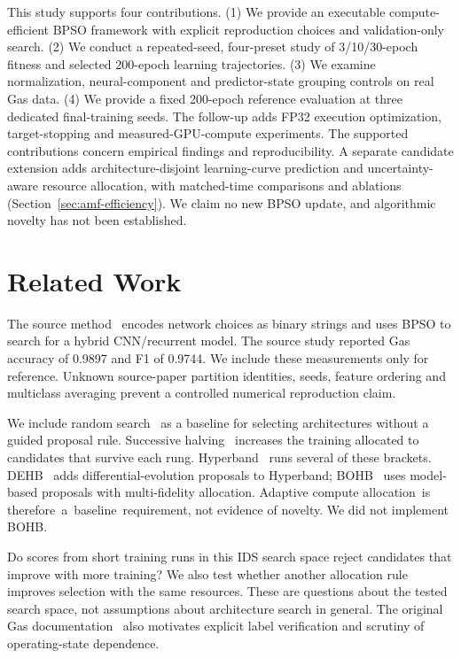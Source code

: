 This study supports four contributions. (1) We provide an executable compute-efficient BPSO framework with explicit reproduction choices and validation-only search. (2) We conduct a repeated-seed, four-preset study of 3/10/30-epoch fitness and selected 200-epoch learning trajectories. (3) We examine normalization, neural-component and predictor-state grouping controls on real Gas data. (4) We provide a fixed 200-epoch reference evaluation at three dedicated final-training seeds. The follow-up adds FP32 execution optimization, target-stopping and measured-GPU-compute experiments. The supported contributions concern empirical findings and reproducibility. A separate candidate extension adds architecture-disjoint learning-curve prediction and uncertainty-aware resource allocation, with matched-time comparisons and ablations (Section~\ref{sec:amf-efficiency}). We claim no new BPSO update, and algorithmic novelty has not been established.

\section{Related Work}
The source method~\cite{lu2025} encodes network choices as binary strings and uses BPSO to search for a hybrid CNN/recurrent model. The source study reported Gas accuracy of 0.9897 and F1 of 0.9744. We include these measurements only for reference. Unknown source-paper partition identities, seeds, feature ordering and multiclass averaging prevent a controlled numerical reproduction claim.

We include random search~\cite{bergstra2012} as a baseline for selecting architectures without a guided proposal rule. Successive halving~\cite{jamieson2016} increases the training allocated to candidates that survive each rung. Hyperband~\cite{li2018} runs several of these brackets. DEHB~\cite{awad2021} adds differential-evolution proposals to Hyperband; BOHB~\cite{falkner2018} uses model-based proposals with multi-fidelity allocation. Adaptive compute \mbox{allocation is} \mbox{therefore a baseline requirement}, not evidence of novelty. We did not implement BOHB.

Do scores from short training runs in this IDS search space reject candidates that improve with more training? We also test whether another allocation rule improves selection with the same resources. These are questions about the tested search space, not assumptions about architecture search in general. The original Gas documentation~\cite{morris2014,hsu2014} also motivates explicit label verification and scrutiny of operating-state dependence.

